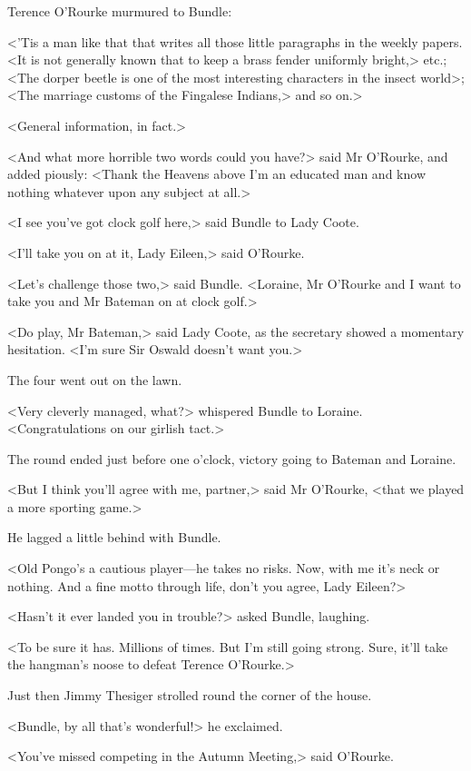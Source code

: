 Terence O'Rourke murmured  to Bundle:

<'Tis a man like that that writes all those little paragraphs in the weekly papers. <It is not generally known that to keep a brass fender uniformly bright,> etc.; <The dorper beetle is one of the most interesting characters in the insect world>; <The marriage customs of the Fingalese Indians,> and so on.>

<General information, in fact.>

<And what more horrible two words could you have?> said Mr O'Rourke, and added piously: <Thank the Heavens above I'm an educated man and know nothing whatever upon any subject at all.>

<I see you've got clock golf here,> said Bundle to Lady Coote.

<I'll take you on at it, Lady Eileen,> said O'Rourke.

<Let's challenge those two,> said Bundle. <Loraine, Mr O'Rourke and I want to take you and Mr Bateman on at clock golf.>

<Do play, Mr Bateman,> said Lady Coote, as the secretary showed a momentary hesitation. <I'm sure Sir Oswald doesn't want you.>

The four went out on the lawn.

<Very cleverly managed, what?> whispered Bundle to Loraine. <Congratulations on our girlish tact.>

The round ended just before one o'clock, victory going to Bateman and Loraine.

<But I think you'll agree with me, partner,> said Mr O'Rourke, <that we played a more sporting game.>

He lagged a little behind with Bundle.

<Old Pongo's a cautious player—he takes no risks. Now, with me it's neck or nothing. And a fine motto through life, don't you agree, Lady Eileen?>

<Hasn't it ever landed you in trouble?> asked Bundle, laughing.

<To be sure it has. Millions of times. But I'm still going strong. Sure, it'll take the hangman's noose to defeat Terence O'Rourke.>

Just then Jimmy Thesiger strolled round the corner of the house.

<Bundle, by all that's wonderful!> he exclaimed.

<You've missed competing in the Autumn Meeting,> said O'Rourke.

